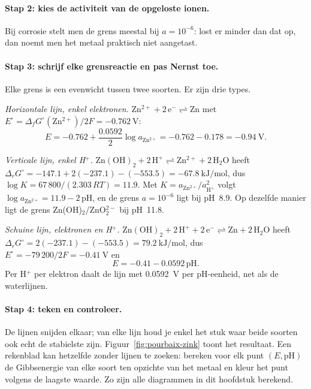 \paragraph{Stap 2: kies de activiteit van de opgeloste ionen.} Bij corrosie stelt men de grens meestal bij $a = 10^{-6}$: lost er minder dan dat op, dan noemt men het metaal praktisch niet aangetast.

\paragraph{Stap 3: schrijf elke grensreactie en pas Nernst toe.} Elke grens is een evenwicht tussen twee soorten. Er zijn drie types.

\emph{Horizontale lijn, enkel elektronen.} $\mathrm{Zn^{2+} + 2\,e^- \rightleftharpoons Zn}$ met $E^\circ = \Delta_fG^\circ(\mathrm{Zn^{2+}})/2F = \SI{-0.762}{\volt}$:
\[
E = -0.762 + \frac{0.0592}{2}\log a_{\mathrm{Zn^{2+}}} = -0.762 - 0.178 = \SI{-0.94}{\volt}.
\]

\emph{Verticale lijn, enkel H$^+$.} $\mathrm{Zn(OH)_2 + 2\,H^+ \rightleftharpoons Zn^{2+} + 2\,H_2O}$ heeft $\Delta_rG^\circ = -147.1 + 2(-237.1) - (-553.5) = \SI{-67.8}{\kilo\joule\per\mole}$, dus $\log K = 67\,800/(2.303\,RT) = 11.9$. Met $K = a_{\mathrm{Zn^{2+}}}/a_{\mathrm{H^+}}^2$ volgt $\log a_{\mathrm{Zn^{2+}}} = 11.9 - 2\,\mathrm{pH}$, en de grens $a = 10^{-6}$ ligt bij pH~8.9. Op dezelfde manier ligt de grens Zn(OH)$_2$/ZnO$_2^{2-}$ bij pH~11.8.

\emph{Schuine lijn, elektronen en H$^+$.} $\mathrm{Zn(OH)_2 + 2\,H^+ + 2\,e^- \rightleftharpoons Zn + 2\,H_2O}$ heeft $\Delta_rG^\circ = 2(-237.1) - (-553.5) = \SI{79.2}{\kilo\joule\per\mole}$, dus $E^\circ = -79\,200/2F = \SI{-0.41}{\volt}$ en
\[
E = -0.41 - 0.0592\,\mathrm{pH}.
\]
Per H$^+$ per elektron daalt de lijn met \SI{0.0592}{\volt} per pH-eenheid, net als de waterlijnen.

\paragraph{Stap 4: teken en controleer.} De lijnen snijden elkaar; van elke lijn houd je enkel het stuk waar beide soorten ook echt de stabielste zijn. Figuur~\ref{fig:pourbaix-zink} toont het resultaat. Een rekenblad kan hetzelfde zonder lijnen te zoeken: bereken voor elk punt $(E, \mathrm{pH})$ de Gibbsenergie van elke soort ten opzichte van het metaal en kleur het punt volgens de laagste waarde. Zo zijn alle diagrammen in dit hoofdstuk berekend.

